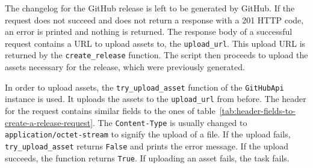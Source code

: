 The changelog for the GitHub release is left to be generated by GitHub.
If the request does not succeed and does not return a response with a 201 HTTP code, an error is printed and nothing is returned.
The response body of a successful request contains a URL to upload assets to, the \verb|upload_url|.
This upload URL is returned by the \verb|create_release| function.
The script then proceeds to upload the assets necessary for the release, which were previously generated.

In order to upload assets, the \verb|try_upload_asset| function of the \verb|GitHubApi| instance is used.
It uploads the assets to the \verb|upload_url| from before.
The header for the request contains similar fields to the ones of table~\ref{tab:header-fields-to-create-a-release-request}.
The \verb|Content-Type| is usually changed to \verb|application/octet-stream| to signify the upload of a file.
If the upload fails, \verb|try_upload_asset| returns \verb|False| and prints the error message.
If the upload succeeds, the function returns \verb|True|.
If uploading an asset fails, the task fails.
